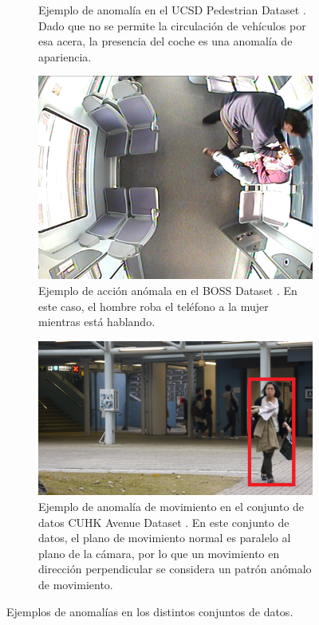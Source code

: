 \documentclass[../main.tex]{memoir}
\begin{document}
\begin{figure}[hbtp]
\begin{subfigure}{0.48\textwidth}
    \caption{Ejemplo de anomalía en el UCSD Pedestrian Dataset
      \cite{mahadevan2010anomaly}. Dado que no se permite la
      circulación de vehículos por esa acera, la presencia del coche
      es una anomalía de apariencia.}
  \end{subfigure}
  \begin{subfigure}{0.48\textwidth}
    \centering
    \includegraphics[width=.9\linewidth]{images/boss-anomaly}
    \caption{Ejemplo de acción anómala en el BOSS Dataset
      \cite{velastin2017people}. En este caso, el hombre roba el
      teléfono a la mujer mientras está hablando.}
  \end{subfigure}
  \begin{subfigure}{0.48\textwidth}
    \centering
    \includegraphics[width=.9\linewidth]{images/avenue-anomaly}
    \caption{Ejemplo de anomalía de movimiento en el conjunto de datos
      CUHK Avenue Dataset \cite{lu2013abnormal}. En este conjunto de
      datos, el plano de movimiento normal es paralelo al plano de la
      cámara, por lo que un movimiento en dirección perpendicular se
      considera un patrón anómalo de movimiento.}
  \end{subfigure}
  \caption{Ejemplos de anomalías en los distintos conjuntos de datos.}
  \label{fig:anomalies}
\end{figure}
\end{document}
